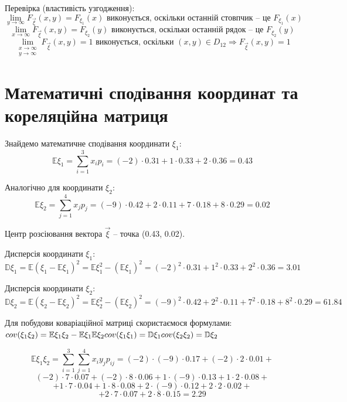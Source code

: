 \documentclass[14pt, a4paper, ukrainian]{extreport}
\begin{document}
	Перевірка (властивість узгодження):\\
	$$ \lim\limits_{y \to \infty} F_{\vec \xi} (x,y) = F_{\xi_1} (x) \text{ виконується, оскільки останній стовпчик -- це } F_{\xi_1} (x)$$
	 $$\lim\limits_{x \to \infty} F_{\vec \xi} (x,y) = F_{\xi_2} (y) \text{ виконується, оскільки останній рядок -- це } F_{\xi_2} (y)$$
	 $$\lim\limits_{
		\begin{gathered}
			x \to \infty\\
			y \to \infty
		\end{gathered}
		} 
		F_{\vec \xi} (x,y) = 1  \text{ виконується, оскільки } (x, y) \in D_12 \Rightarrow F_{\vec \xi} (x, y) = 1 $$
	
	\section{Математичні сподівання координат та кореляційна матриця}
	
	Знайдемо математичне сподівання координати $\xi_1$:
	$$ \mathbb{E}\xi_1 = \sum_{i=1}^{3} x_ip_i = (-2) \cdot 0.31 + 1 \cdot 0.33 + 2 \cdot 0.36 = 0.43 $$
	
	Аналогічно для координати $\xi_2$:
	$$ \mathbb{E}\xi_2 = \sum_{j=1}^{4} x_jp_j = (-9) \cdot 0.42 + 2 \cdot 0.11 + 7 \cdot 0.18 + 8 \cdot 0.29 = 0.02$$
	
	Центр розсіювання вектора $\vec \xi$ -- точка (0.43, 0.02).
	
	Дисперсія координати $\xi_1$:
	$$ \mathbb{D}\xi_1 = \mathbb{E}({\xi_1 - \mathbb{E}\xi_1})^2 = \mathbb{E}\xi_1^2 - (\mathbb{E}\xi_1)^2 = (-2)^2 \cdot 0.31 + 1^2 \cdot 0.33 + 2^2 \cdot 0.36 = 3.01 $$
	
	Дисперсія координати $\xi_2$:	
	$$\mathbb{D}\xi_2 = \mathbb{E}({\xi_2 - \mathbb{E}\xi_2})^2 = \mathbb{E}\xi_2^2 - (\mathbb{E}\xi_2)^2 =		
		(-9)^2 \cdot 0.42 + 2^2 \cdot 0.11 + 7^2 \cdot 0.18 + 8^2 \cdot 0.29 = 61.84	$$
			
	Для побудови коваріаційної матриці скористаємося формулами:\\
		$cov(\xi_1\xi_2) = \mathbb{E}\xi_1\xi_2 - \mathbb{E}\xi_1\mathbb{E}\xi_2\\
		cov(\xi_1\xi_1) = \mathbb{D}\xi_1\\
		cov(\xi_2\xi_2) = \mathbb{D}\xi_2$
		
	$$\mathbb{E}\xi_1\xi_2 = \sum_{i=1}^{3}\sum_{j=1}^{4}x_iy_jp_{ij} = (-2)\cdot(-9)\cdot0.17 + (-2)\cdot2\cdot0.01 + $$
	$$ (-2)\cdot7\cdot0.07 + (-2)\cdot8\cdot0.06 + 1\cdot(-9)\cdot0.13 + 1\cdot2\cdot0.08 +$$
	$$ + 1\cdot7\cdot0.04 + 1\cdot8\cdot0.08 + 2\cdot(-9)\cdot0.12 + 2\cdot2\cdot0.02 + $$
	$$ +2\cdot7\cdot0.07 + 2\cdot8\cdot0.15 = 2.29$$
	
\end{document}
